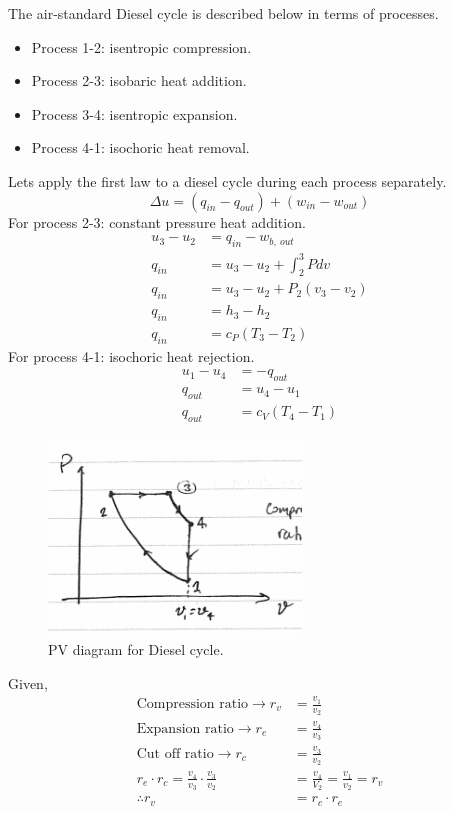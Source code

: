 \documentclass[class=report, crop=false, 12pt,a4paper]{standalone}
\begin{document}
The air-standard Diesel cycle is described below in terms of processes.
\begin{itemize}[noitemsep]
  \item Process 1-2: isentropic compression.
  \item Process 2-3: isobaric heat addition.
  \item Process 3-4: isentropic expansion.
  \item Process 4-1: isochoric heat removal.
\end{itemize}
Lets apply the first law to a diesel cycle during each process separately.
\begin{equation}
  \Delta u = (q_{in} - q_{out}) + (w_{in}- w_{out})
\end{equation}
For process 2-3: constant pressure heat addition.
\begin{align}
  u_3 - u_2 &= q_{in} - w_{b, \ out}\\
  q_{in} &= u_3 - u_2 + \int_2^3 P dv\\
  q_{in} &= u_3 - u_2 + P_2 (v_3 - v_2)\\
  q_{in} &= h_3 - h_2\\
  q_{in} &= c_P (T_3 - T_2)
\end{align}
For process 4-1: isochoric heat rejection.
\begin{align}
  u_1 - u_4 &= - q_{out}\\
  q_{out} &= u_4 - u_1\\
  q_{out} &= c_V (T_4 - T_1)
\end{align}
\begin{figure}
  \centering
  \includegraphics[width = 0.6\textwidth]{../img/PVDiesel}
  \caption{PV diagram for Diesel cycle.}
\end{figure}
Given,
\begin{align}
  \textrm{Compression ratio} \rightarrow r_v &= \frac{v_1}{v_2}\\
  \textrm{Expansion ratio} \rightarrow r_e &= \frac{v_4}{v_3}\\
  \textrm{Cut off ratio} \rightarrow r_c &= \frac{v_3}{v_2}\\
  r_e \cdot r_c = \frac{v_4}{v_3} \cdot \frac{v_3}{v_2} &= \frac{v_4}{V_2} = \frac{v_1}{v_2} = r_v\\
  \therefore r_v &= r_c \cdot r_e
\end{align}
\end{document}
